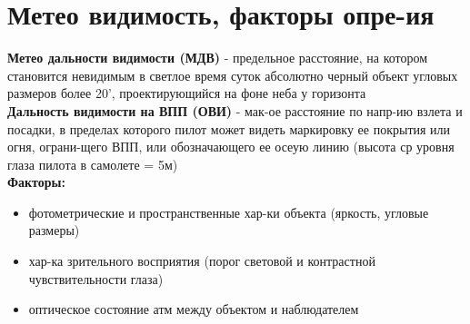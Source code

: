 
\section{Метео видимость, факторы опре-ия}
\textbf{Метео дальности видимости (МДВ)} - предельное расстояние, на котором становится невидимым в светлое время суток абсолютно черный объект угловых размеров более 20', проектирующийся на фоне неба у горизонта\\

\textbf{Дальность видимости на ВПП (ОВИ)} - мак-ое расстояние по напр-ию взлета и посадки, в пределах которого пилот может видеть маркировку ее покрытия или огня, ограни-щего ВПП, или обозначающего ее осеую линию (высота ср уровня глаза пилота в самолете = 5м)\\

\textbf{Факторы:}
\begin{itemize}
	\item фотометрические и пространственные хар-ки объекта (яркость, угловые размеры)
	\item хар-ка зрительного восприятия (порог световой и контрастной чувствительности глаза)
	\item оптическое состояние атм между объектом и наблюдателем
\end{itemize}